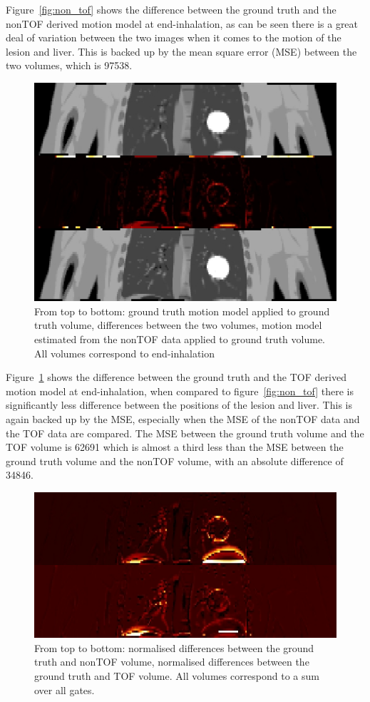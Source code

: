 \documentclass[9pt]{IEEEtran}
\begin{document}
Figure~\ref{fig:non_tof} shows the difference between the ground truth and the nonTOF derived motion model at end-inhalation, as can be seen there is a great deal of variation between the two images when it comes to the motion of the lesion and liver. This is backed up by the mean square error (MSE) between the two volumes, which is 97538.

\begin{figure}
    \centering
    \includegraphics[scale=0.3]{figures/tof.png}
    \caption{From top to bottom: ground truth motion model applied to ground truth volume, differences between the two volumes, motion model estimated from the nonTOF data applied to ground truth volume. All volumes correspond to end-inhalation}
    \label{fig:tof}
\end{figure}

Figure~\ref{fig:tof} shows the difference between the ground truth and the TOF derived motion model at end-inhalation, when compared to figure~\ref{fig:non_tof} there is significantly less difference between the positions of the lesion and liver. This is again backed up by the MSE, especially when the MSE of the nonTOF data and the TOF data are compared. The MSE between the ground truth volume and the TOF volume is 62691 which is almost a third less than the MSE between the ground truth volume and the nonTOF volume, with an absolute difference of 34846.

\begin{figure}
    \centering
    \includegraphics[scale=0.3]{figures/sum.png}
    \caption{From top to bottom: normalised differences between the ground truth and nonTOF volume, normalised differences between the ground truth and TOF volume. All volumes correspond to a sum over all gates.}
    \label{fig:sum}
\end{figure}
\end{document}
